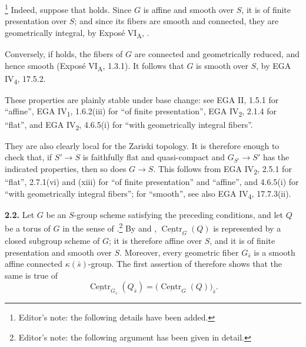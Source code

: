 \footnote{Editor's note: the following details have been added.}
Indeed, suppose that  holds.  Since \(G\) is affine and smooth over
\(S\), it is of finite presentation over \(S\); and since its fibers
are smooth and connected, they are geometrically integral, by
Exposé VI\textsubscript{A}, .

Conversely, if  holds, the fibers of \(G\) are connected and
geometrically reduced, and hence smooth
(Exposé VI\textsubscript{A}, 1.3.1).  It follows that \(G\) is smooth
over \(S\), by EGA IV\textsubscript{4}, 17.5.2.

These properties are plainly stable under base change: see EGA II,
1.5.1 for ``affine'', EGA IV\textsubscript{1}, 1.6.2(iii) for ``of
finite presentation'', EGA IV\textsubscript{2}, 2.1.4 for ``flat'',
and EGA IV\textsubscript{2}, 4.6.5(i) for ``with geometrically integral
fibers''.

They are also clearly local for the Zariski topology.  It is therefore
enough to check that, if \(S'\longrightarrow S\) is faithfully flat and
quasi-compact and \(G_{S'}\longrightarrow S'\) has the indicated
properties, then so does \(G\longrightarrow S\).  This follows from
EGA IV\textsubscript{2}, 2.5.1 for ``flat'', 2.7.1(vi) and (xiii) for
``of finite presentation'' and ``affine'', and 4.6.5(i) for ``with
geometrically integral fibers''; for ``smooth'', see also
EGA IV\textsubscript{4}, 17.7.3(ii).

\par\medskip\noindent{}\textbf{2.2.}\quad
Let \(G\) be an \(S\)-group scheme satisfying the preceding conditions,
and let \(Q\) be a torus of \(G\) in the sense of .\footnote{Editor's note: the following argument has been
given in detail.}
By  and ,
\(\underline{\operatorname{Centr}}_{G}(Q)\) is represented by a closed
subgroup scheme of \(G\); it is therefore affine over \(S\), and it is
of finite presentation and smooth over \(S\).  Moreover, every
geometric fiber \(G_{\bar s}\) is a smooth affine connected
\(\kappa(\bar s)\)-group.  The first assertion of  therefore shows
that the same is true of
\[
  \underline{\operatorname{Centr}}_{G_{\bar s}}(Q_{\bar s})
  =
  \bigl(\underline{\operatorname{Centr}}_{G}(Q)\bigr)_{\bar s}.
\]

